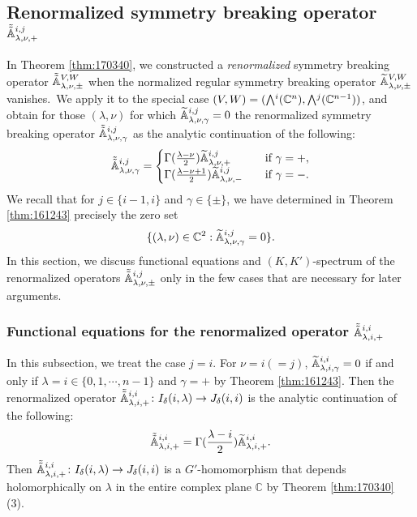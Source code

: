 \subsection{Renormalized symmetry breaking operator $\tilde{\tilde{{\mathbb{A}}}}_{{\lambda},{\nu},{+}}^{{i,j}}$}
\label{subsec:161702}
In Theorem \ref{thm:170340}, 
 we constructed a {\it{renormalized}} symmetry breaking operator
 $\tilde{\tilde{{\mathbb{A}}}}_{{\lambda},{\nu},{\pm}}^{{V,W}}$
 when the normalized regular symmetry breaking operator ${\widetilde{\mathbb{A}}}_{{\lambda},{\nu},{\pm}}^{{V,W}}$
vanishes.~We apply it 
 to the special case
 $(V,W)=(\Exterior^i({\mathbb{C}}^n), \Exterior^j({\mathbb{C}}^{n-1}))$, 
 and obtain for those $(\lambda,\nu)$
 for which ${\widetilde{\mathbb{A}}}_{{\lambda},{\nu},{\gamma}}^{{i,j}}=0$
 the renormalized symmetry breaking operator
 $\tilde{\tilde{{\mathbb{A}}}}_{{\lambda},{\nu},{\gamma}}^{{i,j}}$
 as the analytic continuation of the following:
\begin{equation}
\label{eqn:Aijrenorm}
\tilde{\tilde{{\mathbb{A}}}}_{{\lambda},{\nu},{\gamma}}^{{i,j}}
=
\begin{cases}
\Gamma(\frac{\lambda-\nu}{2}){\widetilde{\mathbb{A}}}_{{\lambda},{\nu},{+}}^{{i,j}}
\quad
&\text{if $\gamma=+$}, 
\\
\Gamma(\frac{\lambda-\nu+1}{2}){\widetilde{\mathbb{A}}}_{{\lambda},{\nu},{-}}^{{i,j}}
\quad
&\text{if $\gamma=-$}.
\end{cases}
\end{equation}  
We recall 
 that for $j \in \{i-1,i\}$
 and $\gamma \in \{\pm\}$, 
 we have determined in Theorem \ref{thm:161243}
 precisely the zero set
\[
   \{
    (\lambda, \nu)\in {\mathbb{C}}^2
    :   
    {\widetilde{\mathbb{A}}}_{{\lambda},{\nu},{\gamma}}^{{i,j}}=0
   \}.  
\]
In this section,
 we discuss functional equations
 and $(K,K')$-spectrum
 of the 
renormalized operators $\tilde{\tilde{{\mathbb{A}}}}_{{\lambda},{\nu},{\pm}}^{{i,j}}$
 only in the few cases
 that are necessary for later arguments.  



\subsubsection{Functional equations
 for the renormalized operator $\tilde{\tilde{{\mathbb{A}}}}_{{\lambda},{i},{+}}^{{i,i}}$}
In this subsection,
 we treat the case $j=i$.  
For $\nu=i(=j)$, 
 ${\widetilde{\mathbb{A}}}_{{\lambda},{i},{\gamma}}^{{i,i}}=0$
 if and only if $\lambda=i \in \{0,1,\cdots,n-1\}$
 and $\gamma=+$ by Theorem \ref{thm:161243}.  
Then the renormalized operator 
$
   \tilde{\tilde{{\mathbb{A}}}}_{{\lambda},{i},{+}}^{{i,i}} \colon I_{\delta}(i,\lambda) \to J_{\delta}(i,i)
$
 is the analytic continuation 
 of the following:
\begin{equation}
\label{eqn:Aii2tilde}
   \tilde{\tilde{{\mathbb{A}}}}_{{\lambda},{i},{+}}^{{i,i}}=\Gamma(\frac{\lambda-i}2){\widetilde{\mathbb{A}}}_{{\lambda},{i},{+}}^{{i,i}}.  
\end{equation}
Then $\tilde{\tilde{{\mathbb{A}}}}_{{\lambda},{i},{+}}^{{i,i}}\colon I_{\delta}(i,\lambda) \to J_{\delta}(i,i)$
 is a $G'$-homomorphism
 that depends holomorphically on $\lambda$
 in the entire complex plane ${\mathbb{C}}$
 by Theorem \ref{thm:170340} (3). 



